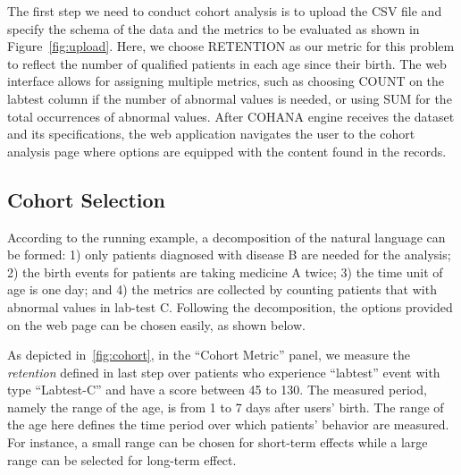 
The first step we need to conduct cohort analysis is to upload the CSV file and specify the schema of the data and the metrics to be evaluated as shown in Figure~\ref{fig:upload}. 
Here, we choose RETENTION as our metric for this problem to reflect the number of qualified patients in each age since their birth. 
The web interface allows for assigning multiple metrics, such as choosing COUNT on the labtest column if the number of abnormal values is needed, or using SUM for the total occurrences of abnormal values. 
After COHANA engine receives the dataset and its specifications, the web application navigates the user to the cohort analysis page where options are equipped with the content found in the records.

\subsection{Cohort Selection}

According to the running example, a decomposition of the natural language can be formed: 1) only patients diagnosed with disease B are needed for the analysis; 2) the birth events for patients are taking medicine A twice; 3) the time unit of age is one day; and 4) the metrics are collected by counting patients that with abnormal values in lab-test C. 
Following the decomposition, the options provided on the web page can be chosen easily, as shown below.

As depicted in~\ref{fig:cohort}, in the ``Cohort Metric'' panel, we measure the \emph{retention} defined in last step over patients who experience ``labtest'' event with type ``Labtest-C'' and have a score between 45 to 130. 
The measured period, namely the range of the age, is from 1 to 7 days after users' birth.
The range of the age here defines the time period over which patients' behavior are measured. For instance, a small range can be chosen for short-term effects while a large range can be selected for long-term effect.

